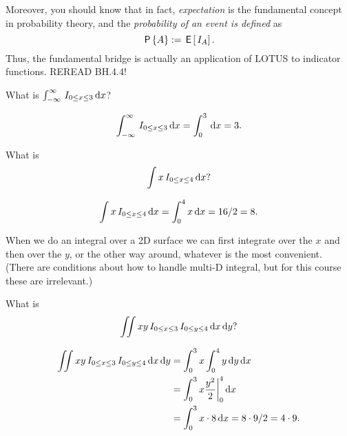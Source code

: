 Moreover, you should know that in fact, \emph{expectation} is the fundamental concept in probability theory, and the \emph{probability of an event is defined} as
\begin{equation}
  \label{eq:4}
  \,\mathsf{P}\left\{A\right\} := \,\mathsf{E}\left[\,I_{A}\right].
\end{equation}
Thus, the fundamental bridge is actually an application of LOTUS to indicator functions. REREAD BH.4.4!


\begin{exercise}
What is $\int_{-\infty}^{\infty} \,I_{0\leq x \leq 3} \,\textrm{d}x$?
\begin{solution}
\begin{align*}
\int_{-\infty}^{\infty} \,I_{0\leq x \leq 3} \,\textrm{d}x =\int_{0}^{3}  \,\textrm{d}x  = 3.
\end{align*}
\end{solution}
\end{exercise}

\begin{exercise}
What is
\begin{equation}
\label{eq:5}
\int x \,I_{0\leq x \leq 4} \,\textrm{d}x?
\end{equation}
\begin{solution}
\begin{align*}
\int x \,I_{0\leq x \leq 4} \,\textrm{d}x  = \int_{0}^{4} x \,\textrm{d}x = 16/2 = 8.
\end{align*}
\end{solution}
\end{exercise}

When we do an integral over a 2D surface we can first integrate over the $x$ and then over the $y$, or the other way around, whatever is the most convenient.
(There are conditions about how to handle multi-D integral, but for this course these are irrelevant.)

\begin{exercise}
What is
\begin{equation}
\label{eq:5}
\iint xy \,I_{0\leq x \leq 3}\,I_{0\leq y \leq 4} \,\textrm{d}x \,\textrm{d}y?
\end{equation}
\begin{solution}
\begin{align*}
\iint xy \,I_{0\leq x \leq 3}\,I_{0\leq y \leq 4} \,\textrm{d}x \,\textrm{d}y
&=\int_{0}^{3} x \int_{0}^{4} y \,\textrm{d}y \,\textrm{d}x\\
&=\int_{0}^{3} x \frac{y^{2}} 2 \biggr|_{0}^{4} \,\textrm{d}x\\
&= \int_{0}^{3} x\cdot 8 \,\textrm{d}x = 8\cdot 9/2 = 4\cdot 9.
\end{align*}
\end{solution}
\end{exercise}

